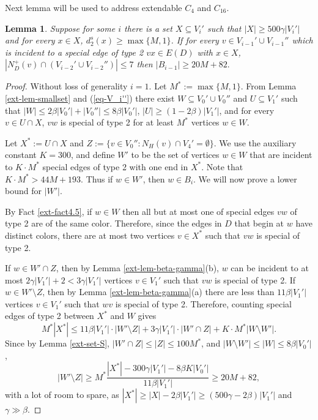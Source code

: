 \documentclass{article}
\newtheorem{lemma}[theorem]{Lemma}
\begin{document}
Next  lemma will be used to address extendable $C_4$ and $C_{16}.$
\begin{lemma}\label{ext-lem-M=1simple}
Suppose for some $i$ there is a set $X\subseteq V_i'$ such that $|X|\geq 500\gamma  |V_i'|$ and for every $x\in X$, $d^s_2(x)\geq \max\{M,1\}$. If for every $v\in V_{i-1}'\cup V_{i-1}''$ which is incident to a special edge of type 2 $vx\in E(D)$ with $x\in X$, $|N^+_D(v) \cap (V_{i-2}'\cup V_{i-2}'')|\leq 7$  then $|B_{i-1}|\geq 20 M+82.$
\end{lemma}
\begin{proof}
Without loss of generality $i=1$. Let $M^*:= \max\{M,1\}$. From Lemma \ref{ext-lem-smallset}  and (\ref{eq-V_i''}) there exist $W\subseteq V_0'\cup V_0''$ and $U\subseteq V_1'$ such that $|W|\leq 2\beta |V_0'|+|V_0''|\leq 8\beta |V_0'|$, $|U|\geq (1-2\beta)|V_1'|$, and for every $v\in U\cap X$, $vw$ is special of type 2 for at least $M^*$ vertices $w\in W$. 

Let $X^*:= U\cap X$ and $Z:=\{v\in V_0'': N_H(v)\cap V_4'=\emptyset\}$. We use the auxiliary constant $K=300$, and define $W'$ to be the set of vertices $w\in {W}$ that are incident to $K\cdot M^*$ special edges of type 2 { with one end in $X^\ast$}. Note that $K\cdot M^*> 44M+193$. Thus if $w\in W'$, then $w\in B_i$. We will now prove a lower bound for $|W'|.$

By Fact \ref{ext-fact4.5}, if $w\in W$ then all but at most one of special edges $vw$ of type 2 are of the same color. Therefore, since the edges in $D$ that begin at $w$ have distinct colors, there are at most two vertices $v\in X^*$ such that $vw$ is special of type 2. 

If $w\in W'\cap Z$, then by Lemma \ref{ext-lem-beta-gamma}(b), $w$ can be incident to at most $2\gamma|V_1'|+2<3\gamma |V_1'|$ vertices $v\in V_1'$ such that $vw$ is special of type 2. If $w\in W'\setminus Z$, then by Lemma \ref{ext-lem-beta-gamma}(a)  there are less than $11\beta |V_1'|$ vertices $v\in V_1'$ such that $wv$ is special of type 2. Therefore, counting special edges of type 2 between $X^*$ and $W$ gives
$$M^*|X^*| \leq 11\beta |V_1'|\cdot |W'\setminus Z|+ 3\gamma |V_1'|\cdot|W'\cap Z| +K\cdot M^*|W\setminus W'|.$$
Since by Lemma \ref{ext-set-S}, $|W'\cap Z|\leq |Z|\leq 100M^*$, and $|W\setminus W'|\leq |W|\leq 8\beta |V_0'|$,
$$|W'\setminus Z|\geq M^*\frac{|X^*|- 300\gamma |V_1'|-8\beta K|V_0'|}{11\beta |V_1'|}\geq 20 M + 82,$$
with a lot of room to spare, as $|X^*|\geq |X|-2\beta |V_1'|\geq (500\gamma-2\beta)|V_1'|$ and $\gamma \gg \beta.$
\end{proof}
\end{document}
